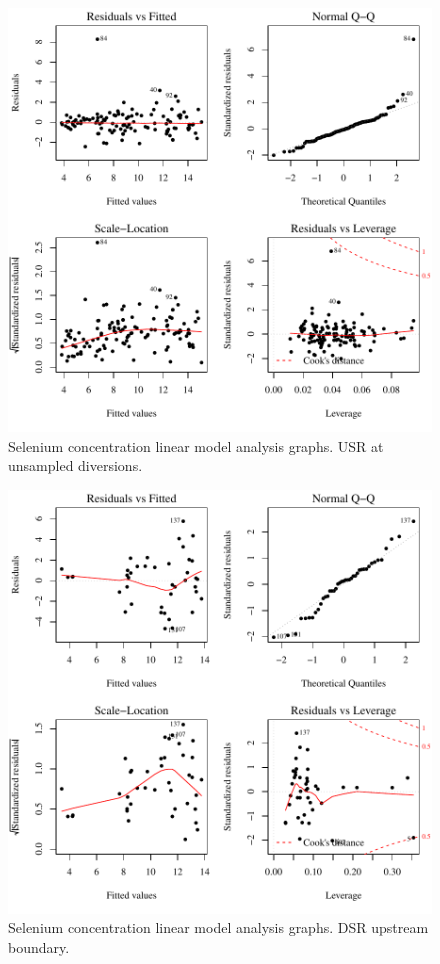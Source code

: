 \begin{figure}[htbp]
	\begin{center}
	\includegraphics[width=6in]{"Figures/Results_USR/Conc Model lm-fit UDIV"}
	\caption{Selenium concentration linear model analysis graphs.  USR at unsampled diversions.}
	\end{center}
\end{figure}
\newpage

\begin{figure}[htbp]
	\begin{center}
	\includegraphics[width=6in]{"Figures/Results_DSR/Conc Model lm-fit D101C"}
	\caption{Selenium concentration linear model analysis graphs.  DSR upstream boundary.}
	\end{center}
\end{figure}
\newpage

